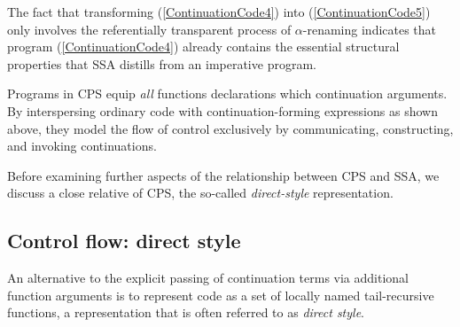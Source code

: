  The fact that transforming (\ref{ContinuationCode4}) into
(\ref{ContinuationCode5}) only involves the referentially transparent
process of $\alpha$-renaming indicates that program
(\ref{ContinuationCode4}) already contains the essential structural
properties that SSA distills from an imperative program.

Programs in CPS equip \emph{all} functions declarations which
continuation arguments. By interspersing ordinary code with
continuation-forming expressions as shown above, they model the flow
of control exclusively by communicating, constructing, and invoking
continuations.

Before examining further aspects of the relationship between CPS and
SSA, we discuss a close relative of CPS, the so-called
\emph{direct-style} representation.


\subsection{Control flow: direct style}
\label{section:Part1:Semantics:DirectStyle}
An alternative to the explicit passing of continuation terms via
additional function arguments is to represent code as a set of locally
named tail-recursive functions, a representation that is often
referred to as \emph{direct style}.

